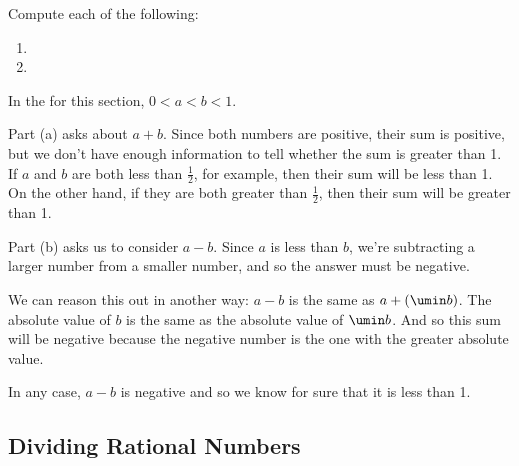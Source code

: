 \begin{boxedex}
Compute each of the following:

\bigskip\begin{enumerate}[itemsep=10pt]
\item {}

\item {}
\end{enumerate}
\end{boxedex}

\begin{boxedex}
In the  for this section, $0 < a < b < 1$.

Part (a) asks about $a + b$. Since both numbers are positive, their sum is positive, but we don't have enough information to tell whether the sum is greater than 1. If $a$ and $b$ are both less than $\frac{1}{2}$, for example, then their sum will be less than 1. On the other hand, if they are both greater than $\frac{1}{2}$, then their sum will be greater than 1.

Part (b) asks us to consider $a - b$. Since $a$ is less than $b$, we're subtracting a larger number from a smaller number, and so the answer must be negative.

We can reason this out in another way: $a-b$ is the same as $a + (\umin b)$. The absolute value of $b$ is the same as the absolute value of $\umin b$. And so this sum will be negative because the negative number is the one with the greater absolute value.

In any case, $a-b$ is negative and so we know for sure that it is less than 1.
\end{boxedex}

\subsection{Dividing Rational Numbers}

